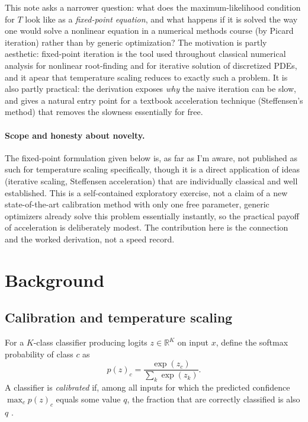 \documentclass[11pt]{article}
\begin{document}
This note asks a narrower question: what does the maximum-likelihood
condition for $T$ look like as a \emph{fixed-point equation}, and what
happens if it is solved the way one would solve a nonlinear equation in
a numerical methods course (by Picard iteration) rather than by
generic optimization? The motivation is partly aesthetic: fixed-point
iteration is the tool used throughout classical numerical analysis for
nonlinear root-finding and for iterative solution of discretized PDEs,
and it apear that temperature scaling reduces to exactly such a problem.
It is also partly practical: the derivation exposes \emph{why} the
naive iteration can be slow, and gives a natural entry point for a
textbook acceleration technique (Steffensen's method) that removes the
slowness essentially for free.

\paragraph{Scope and honesty about novelty.} The fixed-point
formulation given below is, as far as I'm aware, not
published as such for temperature scaling specifically, though it is a
direct application of ideas (iterative scaling, Steffensen
acceleration) that are individually classical and well established.
This is a self-contained exploratory exercise, not a claim of a new
state-of-the-art calibration method with only one free parameter,
generic optimizers already solve this problem essentially instantly,
so the practical payoff of acceleration is deliberately modest. The
contribution here is the connection and the worked derivation, not a
speed record.

\section{Background}

\subsection{Calibration and temperature scaling}

For a $K$-class classifier producing logits $z \in \mathbb{R}^K$ on
input $x$, define the softmax probability of class $c$ as
\begin{equation}
  p(z)_c = \frac{\exp(z_c)}{\sum_{k} \exp(z_k)}.
\end{equation}
A classifier is
\emph{calibrated} if, among all inputs for which the predicted confidence
$\max_c p(z)_c$ equals some value $q$, the fraction that are correctly
classified is also $q$ \citep{guo2017calibration}.
\end{document}
